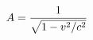 \documentclass[preview]{standalone}
\begin{document}
\begin{align*}
\special{dvisvgm:raw <g id='unique000'>}A = \frac{1}{\sqrt{1 - v^2/c^2}}\special{dvisvgm:raw </g>}
\end{align*}
\end{document}
